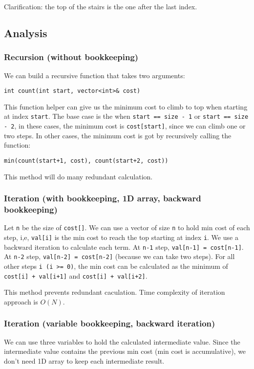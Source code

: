 \documentclass[11pt]{article}
\begin{document}
Clarification: the top of the stairs is the one after the last index.

\subsection{Analysis}
\label{sec:org616bba6}
\subsubsection{Recursion (without bookkeeping)}
\label{sec:org76e4a5c}
We can build a recursive function that takes two arguments:
\begin{verbatim}
int count(int start, vector<int>& cost)
\end{verbatim}

This function helper can give us the minimum cost to climb to top when starting at index \texttt{start}. The base case is the when \texttt{start == size - 1} or \texttt{start == size - 2}, in these cases, the minimum cost is \texttt{cost[start]}, since we can climb one or two steps. In other cases, the minimum cost is got by recursively calling the function:
\begin{verbatim}
min(count(start+1, cost), count(start+2, cost))
\end{verbatim}

This method will do many redundant calculation.
\subsubsection{Iteration (with bookkeeping, 1D array, backward bookkeeping)}
\label{sec:org17da03c}
Let \texttt{n} be the size of \texttt{cost[]}. We can use a vector of size \texttt{n} to hold min cost of each step, i,e, \texttt{val[i]} is the min cost to reach the top starting at index \texttt{i}. We use a backward iteration to calculate each term. At \texttt{n-1} step, \texttt{val[n-1] = cost[n-1]}. At \texttt{n-2} step, \texttt{val[n-2] = cost[n-2]} (because we can take two steps). For all other steps \texttt{i (i >= 0)}, the min cost can be calculated as the minimum of \texttt{cost[i] + val[i+1]} and \texttt{cost[i] + val[i+2]}.

This method prevents redundant caculation. Time complexity of iteration approach is \(O(N)\).

\subsubsection{Iteration (variable bookkeeping, backward iteration)}
\label{sec:org30a52e8}
We can use three variables to hold the calculated intermediate value. Since the intermediate value contains the previous min cost (min cost is accumulative), we don't need 1D array to keep each intermediate result.
\end{document}
